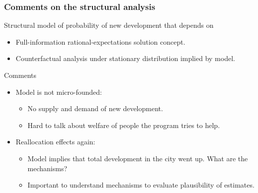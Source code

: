 \documentclass[aspectratio=169, t]{beamer}
\begin{document}
\begin{frame}
    \frametitle{Comments on the structural analysis}
    
    Structural model of probability of new development that depends on 
    \begin{itemize}
        \item Full-information rational-expectations solution concept.
        \item Counterfactual analysis under stationary distribution implied by model.
    \end{itemize}

    \pause
    \vspace{2mm}
    Comments
    \begin{itemize}
        \vspace{1mm}
        \item Model is not micro-founded:
        \begin{itemize}
            \item No supply and demand of new development.
            \item Hard to talk about welfare of people the program tries to help.
        \end{itemize}
        \pause
        \vspace{1mm}
        \item Reallocation effects again:
        \begin{itemize}
            \item Model implies that total development in the city went up. What are the mechanisms?
            \item Important to understand mechanisms to evaluate plausibility of estimates.
        \end{itemize}
    \end{itemize}
\end{frame}
\end{document}
